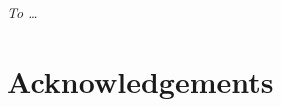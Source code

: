 \documentclass[11pt, a4paper, twosided]{book}
\newcommand{\thesisauthor}{Holly Amelia Rebecca Giles}
\newcommand{\thesisdate}{Oct 01, 2021?}
\begin{document}
\newpage
\thispagestyle{empty}
%
%
%
%

\pagestyle{empty} %





\vspace*{\fill}
\begin{center}
\textit{To \ldots{}}
\end{center}
\vspace*{\fill}
\newpage\null\thispagestyle{empty}\newpage

\pagestyle{plain}
\setcounter{page}{1}    %
\newpage
\hypertarget{acknowledgements}{%
\chapter*{Acknowledgements}\label{acknowledgements}}
\end{document}
